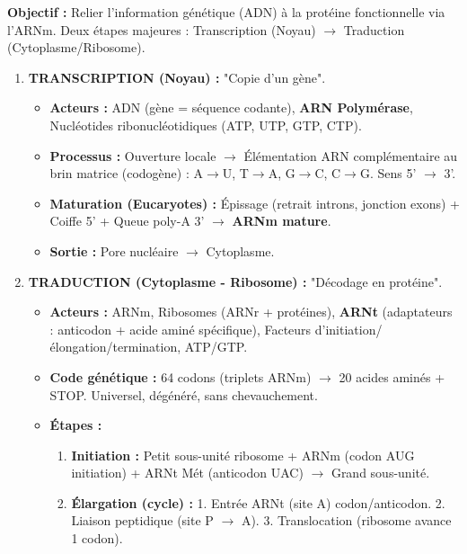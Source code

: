 \documentclass[11pt]{article}
\newcommand{\cle}[1]{{\popxbold\color{popdark}#1}}
\begin{document}
\begin{methode}
    \textbf{Objectif :} Relier l'information génétique (ADN) à la protéine fonctionnelle via l'ARNm. Deux étapes majeures : \cle{Transcription} (Noyau) $\rightarrow$ \cle{Traduction} (Cytoplasme/Ribosome).
    \begin{enumerate}
        \item \textbf{TRANSCRIPTION (Noyau) :} "Copie d'un gène".
            \begin{itemize}
                \item \textbf{Acteurs :} ADN (gène = séquence codante), \textbf{ARN Polymérase}, Nucléotides ribonucléotidiques (ATP, UTP, GTP, CTP).
                \item \textbf{Processus :} Ouverture locale $\rightarrow$ Élémentation ARN complémentaire au brin matrice (codogène) : A$\rightarrow$U, T$\rightarrow$A, G$\rightarrow$C, C$\rightarrow$G. Sens 5' $\rightarrow$ 3'.
                \item \textbf{Maturation (Eucaryotes) :} \cle{Épissage} (retrait introns, jonction exons) + Coiffe 5' + Queue poly-A 3' $\rightarrow$ \textbf{ARNm mature}.
                \item \textbf{Sortie :} Pore nucléaire $\rightarrow$ Cytoplasme.
            \end{itemize}
        \item \textbf{TRADUCTION (Cytoplasme - Ribosome) :} "Décodage en protéine".
            \begin{itemize}
                \item \textbf{Acteurs :} ARNm, Ribosomes (ARNr + protéines), \textbf{ARNt} (adaptateurs : anticodon + acide aminé spécifique), Facteurs d'initiation/élongation/termination, ATP/GTP.
                \item \textbf{Code génétique :} 64 codons (triplets ARNm) $\rightarrow$ 20 acides aminés + STOP. Universel, dégénéré, sans chevauchement.
                \item \textbf{Étapes :}
                    \begin{enumerate}
                        \item \textbf{Initiation :} Petit sous-unité ribosome + ARNm (codon AUG initiation) + ARNt Mét (anticodon UAC) $\rightarrow$ Grand sous-unité.
                        \item \textbf{Élargation (cycle) :} 1. Entrée ARNt (site A) codon/anticodon. 2. Liaison peptidique (site P $\rightarrow$ A). 3. Translocation (ribosome avance 1 codon).

\end{enumerate}
\end{itemize}
\end{enumerate}
\end{methode}
\end{document}
